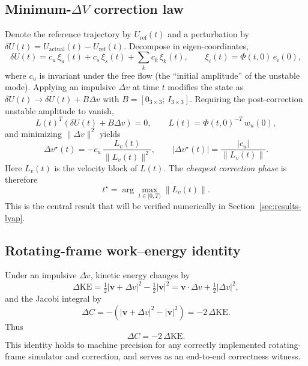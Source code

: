 \documentclass[11pt,a4paper]{article}
\begin{document}
\subsection{Minimum-$\Delta V$ correction law}
Denote the reference trajectory by $U_{\text{ref}}(t)$ and a perturbation by $\delta U(t) = U_{\text{actual}}(t) - U_{\text{ref}}(t)$. Decompose in eigen-coordinates,
\begin{equation}
\delta U(t) = c_u\,\xi_u(t) + c_s\,\xi_s(t) + \sum_k c_k\,\xi_k(t),
\qquad \xi_i(t) = \Phi(t,0)\,e_i(0),
\end{equation}
where $c_u$ is invariant under the free flow (the ``initial amplitude'' of the unstable mode). Applying an impulsive $\Delta v$ at time $t$ modifies the state as $\delta U(t) \to \delta U(t) + B\Delta v$ with $B = [0_{3\times 3};\,I_{3\times 3}]$. Requiring the post-correction unstable amplitude to vanish,
\begin{equation}
L(t)^T (\delta U(t) + B\Delta v) = 0,
\qquad L(t) = \Phi(t,0)^{-T}\,w_u(0),
\end{equation}
and minimizing $\|\Delta v\|^2$ yields
\begin{equation}
\label{eq:mindv}
\boxed{
\Delta v^\star(t) = -c_u\,\frac{L_v(t)}{\|L_v(t)\|^2},
\qquad
|\Delta v^\star(t)| = \frac{|c_u|}{\|L_v(t)\|}.
}
\end{equation}
Here $L_v(t)$ is the velocity block of $L(t)$. The \emph{cheapest correction phase} is therefore
\begin{equation}
t^\star = \arg\max_{t \in [0,T)} \|L_v(t)\|.
\end{equation}
This is the central result that will be verified numerically in Section~\ref{sec:results-lyap}.

\subsection{Rotating-frame work--energy identity}
Under an impulsive $\Delta v$, kinetic energy changes by
\begin{equation}
\Delta \mathrm{KE} = \tfrac{1}{2}|\mathbf{v} + \Delta v|^2 - \tfrac{1}{2}|\mathbf{v}|^2 = \mathbf{v}\cdot\Delta v + \tfrac{1}{2}|\Delta v|^2,
\end{equation}
and the Jacobi integral by
\begin{equation}
\Delta C = -(|\mathbf{v}+\Delta v|^2 - |\mathbf{v}|^2) = -2\,\Delta \mathrm{KE}.
\end{equation}
Thus
\begin{equation}
\boxed{\Delta C = -2\,\Delta \mathrm{KE}.}
\end{equation}
This identity holds to machine precision for any correctly implemented rotating-frame simulator and correction, and serves as an end-to-end correctness witness.
\end{document}
